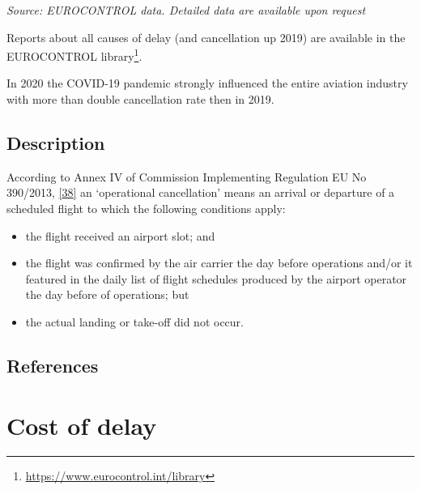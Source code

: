 \documentclass[
  11pt,
  a4paper,
]{book}
\DeclareRobustCommand{\href}[2]{#2\footnote{\url{#1}}}
\begin{document}
\emph{Source: EUROCONTROL data. Detailed data are available upon
request}

Reports about all causes of delay (and cancellation up 2019) are
available in the \href{https://www.eurocontrol.int/library}{EUROCONTROL
library}.

\begin{tcolorbox}[enhanced jigsaw, opacityback=0, arc=.35mm, colframe=quarto-callout-note-color-frame, breakable, left=2mm, leftrule=.75mm, titlerule=0mm, colbacktitle=quarto-callout-note-color!10!white, rightrule=.15mm, opacitybacktitle=0.6, bottomtitle=1mm, colback=white, toptitle=1mm, title=\textcolor{quarto-callout-note-color}{\faInfo}\hspace{0.5em}{Note}, bottomrule=.15mm, toprule=.15mm, coltitle=black]

In 2020 the COVID-19 pandemic strongly influenced the entire aviation
industry with more than double cancellation rate then in 2019.

\end{tcolorbox}

\hypertarget{description-5}{%
\section{Description}\label{description-5}}

According to Annex IV of Commission Implementing Regulation EU No
390/2013, \protect\hyperlink{ref-eureg:3902013}{{[}38{]}} an
`operational cancellation' means an arrival or departure of a scheduled
flight to which the following conditions apply:

\begin{itemize}
\item
  the flight received an airport slot; and
\item
  the flight was confirmed by the air carrier the day before operations
  and/or it featured in the daily list of flight schedules produced by
  the airport operator the day before of operations; but
\item
  the actual landing or take-off did not occur.
\end{itemize}

\hypertarget{references-15}{%
\section{References}\label{references-15}}

\hypertarget{sec-cost-of-delay}{%
\chapter{Cost of delay}\label{sec-cost-of-delay}}
\end{document}
